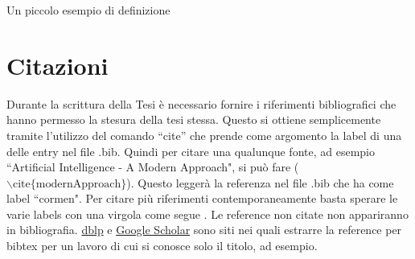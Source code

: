 \begin{defn}
	Un piccolo esempio di definizione
\end{defn}

\begin{table}[ht]
	\centering
	\vspace*{2mm}
	\caption{Esempio di tabella}
	\label{tab:perf}
\end{table}


\section{Citazioni}
Durante la scrittura della Tesi è necessario fornire i riferimenti bibliografici che hanno permesso la stesura della tesi stessa.
Questo si ottiene semplicemente tramite l'utilizzo del comando ``cite'' che prende come argomento la label di una delle entry nel file .bib.
Quindi per citare una qualunque fonte, ad esempio ``Artificial Intelligence - A Modern Approach", si può fare \cite{modernApproach} ($\backslash\text{cite}\{\text{modernApproach}\}$).
Questo leggerà la referenza nel file .bib che ha come label ``cormen".
Per citare più riferimenti contemporaneamente basta sperare le varie labels con una virgola come segue \cite{gelfond1998action,modernApproach,durfee1999distributed,de2003resource,allen2009complexity,bernstein2002complexity}.
Le reference non citate non appariranno in bibliografia.
\href{https://dblp.uni-trier.de/}{dblp} e \href{https://scholar.google.com/}{Google Scholar} sono siti nei quali estrarre la reference per bibtex per un lavoro di cui si conosce solo il titolo, ad esempio.
